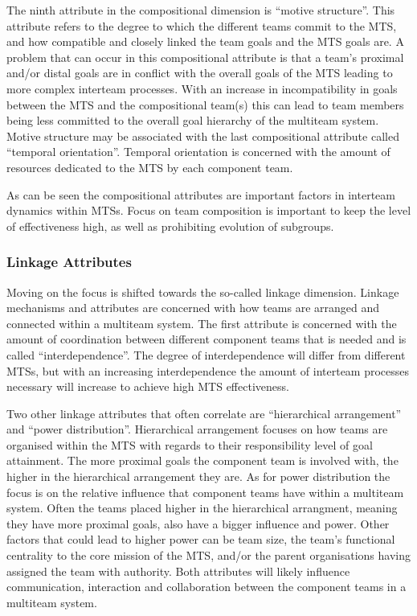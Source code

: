 The ninth attribute in the compositional dimension is ``motive structure''. This attribute refers to the degree to which the different teams commit to the MTS, and how compatible and closely linked the team goals and the MTS goals are. A problem that can occur in this compositional attribute is that a team's proximal and/or distal goals are in conflict with the overall goals of the MTS leading to more complex interteam processes. With an increase in incompatibility in goals between the MTS and the compositional team(s) this can lead to team members being less committed to the overall goal hierarchy of the multiteam system. Motive structure may be associated with the last compositional attribute called ``temporal orientation''. Temporal orientation is concerned with the amount of resources dedicated to the MTS by each component team.

As can be seen the compositional attributes are important factors in interteam dynamics within MTSs. Focus on team composition is important to keep the level of effectiveness high, as well as prohibiting evolution of subgroups.

\subsubsection{Linkage Attributes}

Moving on the focus is shifted towards the so-called linkage dimension. Linkage mechanisms and attributes are concerned with how teams are arranged and connected within a multiteam system. The first attribute is concerned with the amount of coordination between different component teams that is needed and is called ``interdependence''. The degree of interdependence will differ from different MTSs, but with an increasing interdependence the amount of interteam processes necessary will increase to achieve high MTS effectiveness.

Two other linkage attributes that often correlate are ``hierarchical arrangement'' and ``power distribution''. Hierarchical arrangement focuses on how teams are organised within the MTS with regards to their responsibility level of goal attainment. The more proximal goals the component team is involved with, the higher in the hierarchical arrangement they are. As for power distribution the focus is on the relative influence that component teams have within a multiteam system. Often the teams placed higher in the hierarchical arrangment, meaning they have more proximal goals, also have a bigger influence and power. Other factors that could lead to higher power can be team size, the team's functional centrality to the core mission of the MTS, and/or the parent organisations having assigned the team with authority. Both attributes will likely influence communication, interaction and collaboration between the component teams in a multiteam system.

